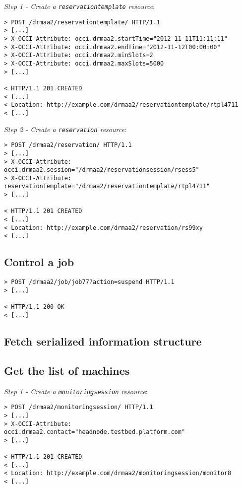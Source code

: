 \documentclass[10pt]{article}
\newcommand{\h}[1]{\lstinline|#1|}
\begin{document}
\emph{Step 1 - Create a \h{reservationtemplate} resource}:

\begin{verbatim}
> POST /drmaa2/reservationtemplate/ HTTP/1.1
> [...]
> X-OCCI-Attribute: occi.drmaa2.startTime="2012-11-11T11:11:11"
> X-OCCI-Attribute: occi.drmaa2.endTime="2012-11-12T00:00:00"
> X-OCCI-Attribute: occi.drmaa2.minSlots=2
> X-OCCI-Attribute: occi.drmaa2.maxSlots=5000
> [...]

< HTTP/1.1 201 CREATED 
< [...] 
< Location: http://example.com/drmaa2/reservationtemplate/rtpl4711
< [...]
\end{verbatim}

\emph{Step 2 - Create a \h{reservation} resource}:

\begin{verbatim}
> POST /drmaa2/reservation/ HTTP/1.1
> [...]
> X-OCCI-Attribute: occi.drmaa2.session="/drmaa2/reservationsession/rsess5"
> X-OCCI-Attribute: reservationTemplate="/drmaa2/reservationtemplate/rtpl4711"
> [...]

< HTTP/1.1 201 CREATED 
< [...] 
< Location: http://example.com/drmaa2/reservation/rs99xy
< [...]
\end{verbatim}


\subsection{Control a job}

\begin{verbatim}
> POST /drmaa2/job/job77?action=suspend HTTP/1.1
> [...]

< HTTP/1.1 200 OK 
< [...] 
\end{verbatim}

\subsection{Fetch serialized information structure}


\subsection{Get the list of machines}

\emph{Step 1 - Create a \h{monitoringsession} resource}:

\begin{verbatim}
> POST /drmaa2/monitoringsession/ HTTP/1.1
> [...]
> X-OCCI-Attribute: occi.drmaa2.contact="headnode.testbed.platform.com"
> [...]

< HTTP/1.1 201 CREATED 
< [...] 
< Location: http://example.com/drmaa2/monitoringsession/monitor8
< [...]
\end{verbatim}
\end{document}
